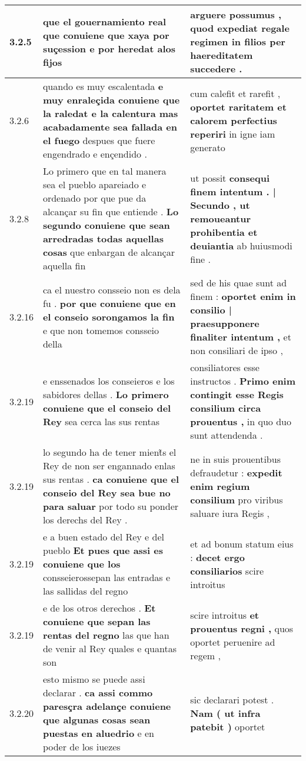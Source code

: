 \begin{tabular}{|p{1cm}|p{6.5cm}|p{6.5cm}|}
3.2.5 & que el gouernamiento real \textbf{ que conuiene que xaya por suçession } e por heredat alos fijos & arguere possumus , \textbf{ quod expediat regale regimen } in filios per haereditatem succedere . \\\hline
3.2.6 & quando es muy escalentada \textbf{ e muy enraleçida conuiene que la raledat e la calentura mas acabadamente sea fallada en el fuego } despues que fuere engendrado e ençendido . & cum calefit et rarefit , \textbf{ oportet raritatem et calorem perfectius reperiri } in igne iam generato \\\hline
3.2.8 & Lo primero que en tal manera sea el pueblo apareiado e ordenado por que pue da alcançar su fin que entiende . \textbf{ Lo segundo conuiene que sean arredradas todas aquellas cosas } que enbargan de alcançar aquella fin & ut possit \textbf{ consequi finem intentum . | Secundo , ut remoueantur prohibentia et deuiantia } ab huiusmodi fine . \\\hline
3.2.16 & ca el nuestro consseio non es dela fu . \textbf{ por que conuiene que en el conseio sorongamos la fin } e que non tomemos consseio della & sed de his quae sunt ad finem : \textbf{ oportet enim in consilio | praesupponere finaliter intentum , } et non consiliari de ipso , \\\hline
3.2.19 & e enssenados los conseieros e los sabidores dellas . \textbf{ Lo primero conuiene que el conseio del Rey } sea cerca las sus rentas & consiliatores esse instructos . \textbf{ Primo enim contingit esse Regis consilium circa prouentus , } in quo duo sunt attendenda . \\\hline
3.2.19 & lo segundo ha de tener mient̃s el Rey de non ser engannado enlas sus rentas . \textbf{ ca conuiene que el conseio del Rey sea bue no para saluar } por todo su ponder los derechs del Rey . & ne in suis prouentibus defraudetur : \textbf{ expedit enim regium consilium } pro viribus saluare iura Regis , \\\hline
3.2.19 & e a buen estado del Rey e del pueblo \textbf{ Et pues que assi es conuiene que los } consseierossepan las entradas e las sallidas del regno & et ad bonum statum eius : \textbf{ decet ergo consiliarios } scire introitus \\\hline
3.2.19 & e de los otros derechos . \textbf{ Et conuiene que sepan las rentas del regno } las que han de venir al Rey quales e quantas son & scire introitus \textbf{ et prouentus regni , } quos oportet peruenire ad regem , \\\hline
3.2.20 & esto mismo se puede assi declarar . \textbf{ ca assi commo paresçra adelançe conuiene que algunas cosas sean puestas en aluedrio } e en poder de los iuezes & sic declarari potest . \textbf{ Nam ( ut infra patebit ) } oportet \\\hline

\end{tabular}
